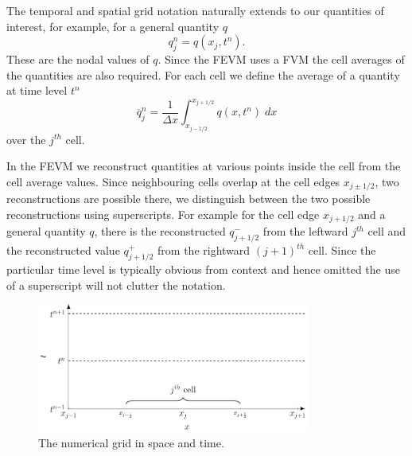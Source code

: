 The temporal and spatial grid notation naturally extends to our quantities of interest, for example, for a general quantity $q$
\begin{equation*}
q^n_j = q(x_j ,t^n). 
\end{equation*}
These are the nodal values of $q$. Since the FEVM uses a FVM the cell averages of the quantities are also required. For each cell we define the average of a quantity at time level $t^n$
\begin{equation*}
\overline{q}_j^n = \frac{1}{\Delta x} \int_{x_{j-1/2}}^{x_{j+1/2}} q(x,t^n) \; dx
\end{equation*}
over the $j^{th}$ cell.

In the FEVM we reconstruct quantities at various points inside the cell from the cell average values. Since neighbouring cells overlap at the cell edges $x_{j\pm1/2}$, two reconstructions are possible there, we distinguish between the two possible reconstructions using superscripts. For example for the cell edge $x_{j+1/2}$ and a general quantity $q$, there is the reconstructed $q^-_{j+1/2}$ from the leftward $j^{th}$ cell and the reconstructed value $q^+_{j+1/2}$ from the rightward $(j+1)^{th}$ cell. Since the particular time level is typically obvious from context and hence omitted the use of a superscript will not clutter the notation.

\begin{figure}
	\centering
	\includegraphics[width=0.8\textwidth]{./chp3/figures/Discretisation.pdf}
	\caption{The numerical grid in space and time.}
	\label{fig:NumericalGrid}
\end{figure}

